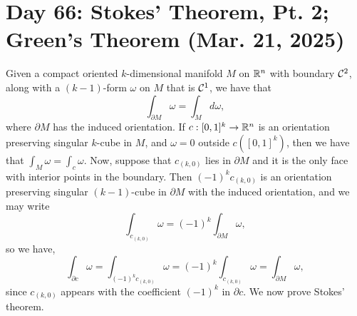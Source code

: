 \section{Day 66: Stokes' Theorem, Pt. 2; Green's Theorem (Mar. 21, 2025)}
Given a compact oriented $k$-dimensional manifold $M$ on $\mathbb R^n$ with boundary $\mathcal C^2$, along with a $(k-1)$-form $\omega$ on $M$ that is $\mathcal C^1$, we have that
\[ \int_{\partial M} \omega = \int_M d\omega, \]
where $\partial M$ has the induced orientation. If $c : [0, 1]^k \to \mathbb R^n$ is an orientation preserving singular $k$-cube in $M$, and $\omega = 0$ outside $c([0, 1]^k)$, then we have that $\int_M \omega = \int_c \omega$. Now, suppose that $c_{(k, 0)}$ lies in $\partial M$ and it is the only face with interior points in the boundary. Then $(-1)^k c_{(k, 0)}$ is an orientation preserving singular $(k-1)$-cube in $\partial M$ with the induced orientation, and we may write
\[ \int_{c_{(k, 0)}} \omega = (-1)^k \int_{\partial M} \omega, \]
so we have,
\[ \int_{\partial c} \omega = \int_{(-1)^k c_{(k, 0)}} \omega = (-1)^k \int_{c_{(k, 0)}} \omega = \int_{\partial M} \omega, \]
since $c_{(k, 0)}$ appears with the coefficient $(-1)^k$ in $\partial c$. We now prove Stokes' theorem.
